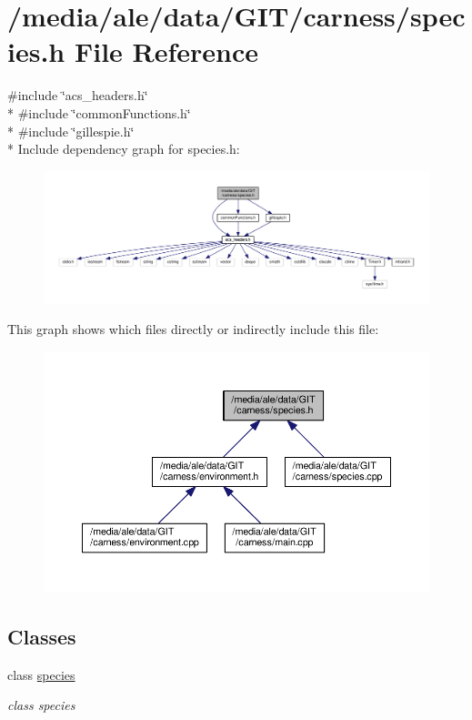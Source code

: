\hypertarget{a00045}{\section{/media/ale/data/\-G\-I\-T/carness/species.h File Reference}
\label{a00045}
}
{\ttfamily \#include \char`\"{}acs\-\_\-headers.\-h\char`\"{}}\\*
{\ttfamily \#include \char`\"{}common\-Functions.\-h\char`\"{}}\\*
{\ttfamily \#include \char`\"{}gillespie.\-h\char`\"{}}\\*
Include dependency graph for species.\-h\-:\nopagebreak
\begin{figure}[H]
\begin{center}
\leavevmode
\includegraphics[width=350pt]{a00080}
\end{center}
\end{figure}
This graph shows which files directly or indirectly include this file\-:\nopagebreak
\begin{figure}[H]
\begin{center}
\leavevmode
\includegraphics[width=350pt]{a00081}
\end{center}
\end{figure}
\subsection*{Classes}
\begin{DoxyCompactItemize}
\item 
class \hyperlink{a00022}{species}
\begin{DoxyCompactList}\small\item\em class species \end{DoxyCompactList}\end{DoxyCompactItemize}
